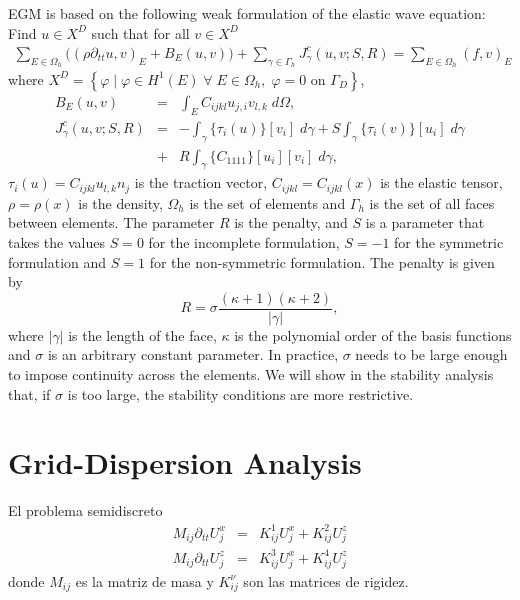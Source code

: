 \documentclass[review,hidelinks,onefignum,onetabnum]{siamart220329}
\newcommand{\mitbf}[1]{\boldsymbol{\mathit{#1}}}
\newcommand{\dgpenalty}{R}
\newcommand{\dgsform}{S}
\begin{document}
EGM is based on the following weak formulation of the elastic wave equation:
Find $\mitbf u\in \mitbf{X}^D$ such that for all $\mitbf v\in \mitbf{X}^D$
\begin{eqnarray}
\sum_{E\in \Omega_h} \Big( \left( \rho \partial_{tt} \mitbf u, \mitbf v \right )_E
	+{\mitbf B_E(\mitbf u, \mitbf v)} \Big)
	+ \sum_{\gamma\in\Gamma_h}{\mitbf J^c_\gamma(\mitbf u, \mitbf v; \dgsform, \dgpenalty)} =
	\sum_{E\in \Omega_h} ( \mitbf f, \mitbf v)_E
	\label{eq:elast_dg_weak}
\end{eqnarray}
where
$X^D = \left\{ \varphi \mid \varphi\in\mitbf H^1(E) \; \forall\; E\in \Omega_h,\;\varphi=0 \textrm{ on }\Gamma_D \right\}$,
\begin{eqnarray}
\mitbf B_E(\mitbf u, \mitbf v) &=&
\int_E C_{ijkl} u_{j,i} v_{l,k} \;d\Omega,
\\
{\mitbf J^c_\gamma(\mitbf u, \mitbf v; \dgsform, \dgpenalty)} &=&
- \int_{\gamma} \{\tau_i(\mitbf u)\}[v_i] \;d\gamma
+ \dgsform \int_{\gamma} \{\tau_i(\mitbf v)\}[u_i] \;d\gamma
\label{eq:jfunc}
\\ \nonumber
&+& \dgpenalty\int_{\gamma}\{C_{1111}\}[u_i][v_i]\;d\gamma,
\end{eqnarray}
$\tau_i(\mitbf u)=C_{ijkl} u_{l,k} n_j$ is the traction vector,
$C_{ijkl} = C_{ijkl}(\mitbf x)$ is the elastic tensor,
$\rho=\rho(\mitbf{x})$ is the density,
$\Omega_h$ is the set of elements and
$\Gamma_h$ is the set of all faces between elements.
The parameter $\dgpenalty$ is the penalty, and
$\dgsform$ is a parameter that takes the values
$\dgsform=0$ for the incomplete formulation,
$\dgsform=-1$ for the symmetric formulation and
$\dgsform=1$ for the non-symmetric formulation.
The penalty is given by 
$$
R= \sigma \frac{(\kappa + 1)(\kappa + 2)}{|\gamma|},
$$
where $|\gamma|$ is the length of the face, 
$\kappa$ is the polynomial order of the basis functions and 
$\sigma$ is an arbitrary constant parameter. 
In practice, $\sigma$ needs to be large enough to impose continuity across the elements. We will show in the stability analysis that, if $\sigma$ is too large, the stability conditions are more restrictive.



\section{Grid-Dispersion Analysis}

El problema semidiscreto
\begin{eqnarray*}
M_{ij}\partial_{tt} U^x_j &=& K^1_{ij} U^x_j +  K^2_{ij} U^z_j
\\
M_{ij}\partial_{tt} U^z_j &=& K^3_{ij} U^x_j +  K^4_{ij} U^z_j
\end{eqnarray*}
donde $M_{ij}$ es la matriz de masa y $K^\nu_{ij}$ son las matrices de rigidez.
\end{document}
